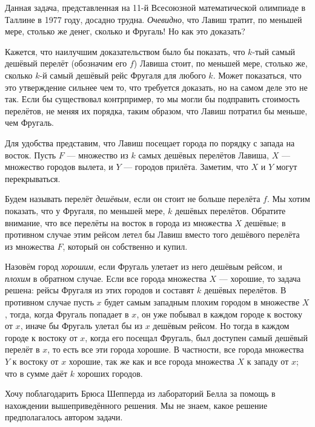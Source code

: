 Данная задача, представленная на 11-й Всесоюзной математической олимпиаде в Таллине в 1977 году, досадно трудна. %
\emph{Очевидно}, что Лавиш тратит, по меньшей мере, столько же денег, сколько и Фругаль!
Но как это доказать? %

\medskip

Кажется, что наилучшим доказательством было бы показать, что $k$-тый самый
дешёвый перелёт (обозначим его $f$) Лавиша стоит, по меньшей мере, столько же, сколько $k$-й самый дешёвый рейс Фругаля для любого $k$.
Может показаться, что это утверждение сильнее чем то, что требуется доказать, но на самом деле это не так.
Если бы существовал контрпример, то мы могли бы подправить стоимость перелётов, не меняя их порядка, таким образом, что Лавиш потратил бы меньше, чем Фругаль.

Для удобства представим, что Лавиш посещает города по порядку с запада на восток.
Пусть $F$ --- множество из $k$ самых дешёвых перелётов Лавиша, $X$ --- множество городов вылета, и $Y$ --- городов прилёта.
Заметим, что $X$ и $Y$ могут перекрываться.

Будем называть перелёт \emph{дешёвым}, если он стоит не больше перелёта $f$.
Мы хотим показать, что у Фругаля, по меньшей мере, $k$ дешёвых перелётов.
Обратите внимание, что все перелёты на восток в города из множества $X$ дешёвые; в противном случае этим рейсом летел бы Лавиш вместо того дешёвого перелёта из множества $F$, который он собственно и купил.

Назовём город \emph{хорошим}, если Фругаль улетает из него дешёвым рейсом, и \emph{плохим} в обратном случае.
Если все города множества $X$ --- хорошие, то задача решена: рейсы Фругаля из этих городов и составят $k$ дешёвых перелётов.
В противном случае пусть $x$ будет самым западным плохим городом в множестве $X$, тогда, когда Фругаль попадает в $x$, он уже побывал в каждом городе к востоку от $x$, иначе бы Фругаль улетал бы из $x$ дешёвым рейсом.
Но тогда в каждом городе к востоку от $x$, когда его посещал Фругаль, был доступен самый дешёвый перелёт в $x$, то есть все эти города хорошие.
В частности, все города множества $Y$ к востоку от $x$ хорошие, так же как и все города множества $X$ к западу от $x$; что в сумме даёт $k$ хороших городов.
\heart

Хочу поблагодарить Брюса Шепперда %
из лабораторий Белла %
за помощь в нахождении вышеприведённого решения.
Мы не знаем, какое решение предполагалось автором задачи.

